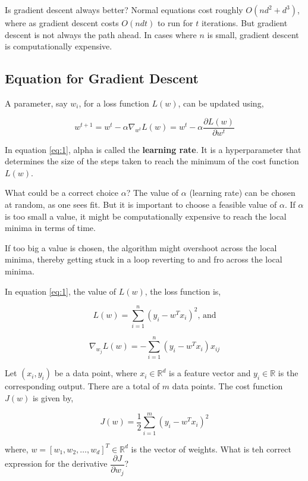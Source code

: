 \documentclass{article}
\newcounter{problem}
\begin{document}
	\pagebreak
	
	\begin{info}{Is gradient descent always better?}
		Normal equations cost roughly \(O(nd^2+d^3)\), where as gradient descent costs \(O(ndt)\) to run for \(t\) iterations. But gradient descent is not always the path ahead. In cases where \(n\) is small, gradient descent is computationally expensive.
	\end{info}

	\subsection{Equation for Gradient Descent}
	
	A parameter, say \(w_i\), for a loss function \(L(w)\), can be updated using,
	
	\begin{equation}\label{eq:1}
		w^{t+1}=w^t-\alpha\nabla_{w^t}L(w)=w^t-\alpha\frac{\partial L(w)}{\partial w^t}	
	\end{equation}

	In equation \eqref{eq:1}, alpha is called the \textbf{learning rate}. It is a hyperparameter that determines the size of the steps taken to reach the minimum of the cost function \(L(w)\).
	
	\begin{info}{What could be a correct choice $\alpha$?}
		The value of \(\alpha\) (learning rate) can be chosen at random, as one sees fit. But it is important to choose a feasible value of \(\alpha\). If \(\alpha\) is too small a value, it might be computationally expensive to reach the local minima in terms of time.
		
		If too big a value is chosen, the algorithm might overshoot across the local minima, thereby getting stuck in a loop reverting to and fro across the local minima.
	\end{info}

	In equation \eqref{eq:1}, the value of \(L(w)\), the loss function is,
	
	\begin{equation}\label{eq:2}
		L(w)=\sum_{i=1}^n(y_i-w^Tx_i)^2\text{, and}
	\end{equation}

	\begin{equation}\label{eq:3}
		\nabla_{w_j}L(w)=-\sum_{i=1}^{n}(y_i-w^Tx_i)x_{ij}
	\end{equation}

	\pagebreak
	
	\begin{problem}
		Let \((x_i,y_i)\) be a data point, where \(x_i\in\mathbb{R}^d\) is a feature vector and \(y_i\in\mathbb{R}\) is the corresponding output. There are a total of \(m\) data points. The cost function \(J(w)\) is given by,
		
		\[
			J(w)=\frac12\sum_{i=1}^m(y_i-w^Tx_i)^2
		\]
		
		where, \(w=[w_1,w_2,\hdots,w_d]^T\in\mathbb{R}^d\) is the vector of weights. What is teh correct expression for the derivative \(\dfrac{\partial J}{\partial w_j}\)?
	\end{problem}
\end{document}
